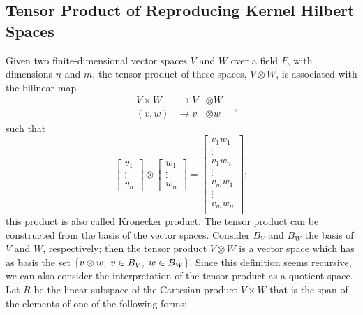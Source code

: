 \subsection{Tensor Product of Reproducing Kernel Hilbert Spaces}
Given two finite-dimensional vector spaces $V$ and $W$ over a field $F$, with dimensions $n$ and $m$, the tensor product of these spaces, $V \otimes W$, is associated with the bilinear map
\begin{equation}
    \nonumber
    \begin{aligned}
         & V \times W & \to V & \otimes W & \\
         & (v, w)     & \to v & \otimes w &
    \end{aligned},
\end{equation}
such that
\begin{equation}
    \label{eq:kron_product}
    \begin{bmatrix}
        v_1    \\
        \vdots \\
        v_n
    \end{bmatrix}
    \otimes
    \begin{bmatrix}
        w_1    \\
        \vdots \\
        w_n
    \end{bmatrix}
    =
    \begin{bmatrix}
        v_1 w_1 \\
        \vdots  \\
        v_1 w_n \\
        \vdots  \\
        v_m w_1 \\
        \vdots  \\
        v_m w_n \\
    \end{bmatrix} ;
\end{equation}
this product is also called Kronecker product.
The tensor product can be constructed from the basis of the vector spaces. Consider $B_V$ and $B_W$ the basis of $V$ and $W$, respectively; then the tensor product $V \otimes W$ is a vector space which has as basis the set $\left\{v \otimes w, \; v \in B_V, \; w \in B_W\right\}$.
%
Since this definition seems recursive, we can also consider the interpretation of the tensor product as a quotient space.
Let $R$ be the linear subspace of the Cartesian product $V \times W$ that is the span of the elements of one of the following forms:
